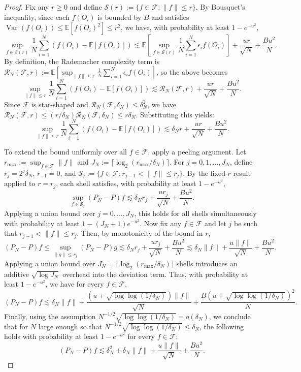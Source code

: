 \documentclass[11pt]{article}
\theoremstyle{plain}
\theoremstyle{definition}
\theoremstyle{remark}
\theoremstyle{definition}
\begin{document}
\begin{proof}
Fix any \( r \ge 0 \) and define \( \mathcal{S}(r) := \{ f \in \mathcal{F} : \|f\| \le r \} \). By Bousquet’s inequality, since each \( f(O_i) \) is bounded by \( B \) and satisfies \( \operatorname{Var}(f(O_i)) \le \mathbb{E}[f(O_i)^2] \le r^2 \), we have, with probability at least \( 1 - e^{-u^2} \),
\[
\sup_{f \in \mathcal{S}(r)} \frac{1}{N} \sum_{i=1}^N (f(O_i) - \mathbb{E}[f(O_i)])
\lesssim \mathbb{E} \left[ \sup_{f \in \mathcal{S}(r)} \frac{1}{N} \sum_{i=1}^N \epsilon_i f(O_i) \right] + \frac{u r}{\sqrt{N}} + \frac{B u^2}{N}.
\]
By definition, the Rademacher complexity term is \( \mathcal{R}_N(\mathcal{F}, r) := \mathbb{E} \left[ \sup_{\|f\| \le r} \frac{1}{N} \sum_{i=1}^N \epsilon_i f(O_i) \right] \), so the above becomes
\[
\sup_{\|f\| \le r} \frac{1}{N} \sum_{i=1}^N (f(O_i) - \mathbb{E}[f(O_i)])
\lesssim \mathcal{R}_N(\mathcal{F}, r) + \frac{u r}{\sqrt{N}} + \frac{B u^2}{N}.
\]
Since \( \mathcal{F} \) is star-shaped and \( \mathcal{R}_N(\mathcal{F}, \delta_N) \le \delta_N^2 \), we have \( \mathcal{R}_N(\mathcal{F}, r) \le (r / \delta_N) \mathcal{R}_N(\mathcal{F}, \delta_N) \le r \delta_N \).  Substituting this yields:
\[
\sup_{\|f\| \le r} \frac{1}{N} \sum_{i=1}^N (f(O_i) - \mathbb{E}[f(O_i)])
\lesssim \delta_N r + \frac{u r}{\sqrt{N}} + \frac{B u^2}{N}.
\]

To extend the bound uniformly over all \(f \in \mathcal{F}\), apply a peeling argument. Let
\( r_{\max} := \sup_{f \in \mathcal{F}} \|f\| \) and
\( J_N := \lceil \log_2(r_{\max}/\delta_N) \rceil \). For \(j = 0, 1, \dots, J_N\), define
\( r_j = 2^j \delta_N \),
\( r_{-1} = 0 \), and
\( \mathcal{S}_j := \{ f \in \mathcal{F} : r_{j-1} < \|f\| \le r_j \} \). By the fixed-\(r\) result applied to \(r = r_j\), each shell satisfies, with probability at least \(1 - e^{-u^2}\),
\[
\sup_{f \in \mathcal{S}_j} (P_N - P)f \lesssim \delta_N r_j + \frac{u r_j}{\sqrt{N}} + \frac{B u^2}{N}.
\]
Applying a union bound over \(j = 0, \dots, J_N\), this holds for all shells simultaneously with probability at least \(1 - (J_N + 1)e^{-u^2}\). Now fix any \(f \in \mathcal{F}\) and let \(j\) be such that \(r_{j-1} < \|f\| \le r_j\). Then, by monotonicity of the bound in \(r\),
\[
(P_N - P)f \le \sup_{\|g\| \le r_j} (P_N - P)g \lesssim \delta_N r_j + \frac{u r_j}{\sqrt{N}} + \frac{B u^2}{N} \lesssim \delta_N \|f\| + \frac{u \|f\|}{\sqrt{N}} + \frac{B u^2}{N}.
\]
Applying a union bound over \(J_N = \lceil \log_2(r_{\max}/\delta_N) \rceil\) shells introduces an additive \(\sqrt{\log J_N}\) overhead into the deviation term. Thus, with probability at least \(1 - e^{-u^2}\), we have for every \(f \in \mathcal{F}\),
\[
(P_N - P)f \lesssim \delta_N \|f\| + \frac{(u + \sqrt{\log \log(1/\delta_N)}) \|f\|}{\sqrt{N}} + \frac{B (u + \sqrt{\log \log(1/\delta_N)})^2}{N}.
\]
Finally, using the assumption \( N^{-1/2} \sqrt{\log \log (1/\delta_N)} = o(\delta_N) \), we conclude that for \(N\) large enough so that \( N^{-1/2} \sqrt{\log \log (1/\delta_N)} \le \delta_N \), the following holds with probability at least \(1 - e^{-u^2}\) for every \( f \in \mathcal{F} \):
\[
(P_N - P)f \lesssim \delta_N^2 + \delta_N \|f\| + \frac{u\|f\|}{\sqrt{N}} + \frac{B u^2 }{N}.
\]






\end{proof}
\end{document}
